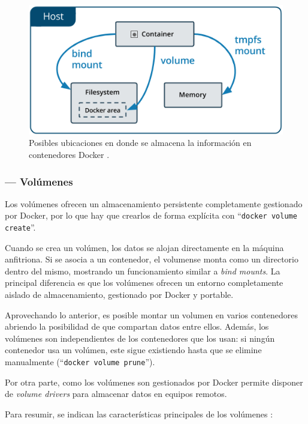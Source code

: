 \begin{figure}[H]
    \centering
    \includegraphics[width=.7\linewidth]{pictures/types-of-mounts.png}
    \caption{Posibles ubicaciones en donde se almacena la información en contenedores Docker \cite{ManageDataDocker2021}.}
\end{figure}

\subsubsection*{\indent --- Volúmenes}
Los volúmenes ofrecen un almacenamiento persistente completamente gestionado por Docker,
por lo que hay que crearlos de forma explícita con ``\lstinline[style=bash]!docker volume create!''.

Cuando se crea un volúmen, los datos se alojan directamente en la máquina anfitriona.
Si se asocia a un contenedor, el volumense monta como un directorio dentro del mismo,
mostrando un funcionamiento similar a \textit{bind mounts}. La principal diferencia
es que los volúmenes ofrecen un entorno completamente aislado de almacenamiento,
gestionado por Docker y portable.

Aprovechando lo anterior, es posible montar un volumen en varios contenedores
abriendo la posibilidad de que compartan datos entre ellos. Además,
los volúmenes son independientes de los contenedores que los usan: si ningún contenedor
usa un volúmen, este sigue existiendo hasta que se elimine manualmente (``\lstinline[style=bash]!docker volume prune!'').

Por otra parte, como los volúmenes son gestionados por Docker permite disponer de
\textit{volume drivers} para almacenar datos en equipos remotos.

Para resumir, se indican las características principales de los volúmenes \cite{UseVolumes2021}:

